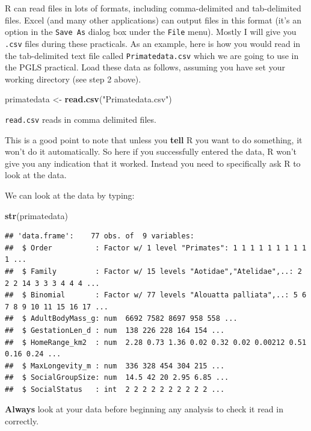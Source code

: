 \documentclass[]{book}
\newenvironment{Shaded}{\begin{snugshade}}{\end{snugshade}}
\newcommand{\KeywordTok}[1]{\textcolor[rgb]{0.13,0.29,0.53}{\textbf{{#1}}}}
\newcommand{\StringTok}[1]{\textcolor[rgb]{0.31,0.60,0.02}{{#1}}}
\newcommand{\NormalTok}[1]{{#1}}
\begin{document}
R can read files in lots of formats, including comma-delimited and
tab-delimited files. Excel (and many other applications) can output
files in this format (it's an option in the \texttt{Save\ As} dialog box
under the \texttt{File} menu). Mostly I will give you \texttt{.csv}
files during these practicals. As an example, here is how you would read
in the tab-delimited text file called \texttt{Primatedata.csv} which we
are going to use in the PGLS practical. Load these data as follows,
assuming you have set your working directory (see step 2 above).

\begin{Shaded}
\begin{Highlighting}[]
\NormalTok{primatedata <-}\StringTok{ }\KeywordTok{read.csv}\NormalTok{(}\StringTok{"Primatedata.csv"}\NormalTok{)}
\end{Highlighting}
\end{Shaded}

\texttt{read.csv} reads in comma delimited files.

This is a good point to note that unless you \textbf{tell} R you want to
do something, it won't do it automatically. So here if you successfully
entered the data, R won't give you any indication that it worked.
Instead you need to specifically ask R to look at the data.

We can look at the data by typing:

\begin{Shaded}
\begin{Highlighting}[]
\KeywordTok{str}\NormalTok{(primatedata)}
\end{Highlighting}
\end{Shaded}

\begin{verbatim}
## 'data.frame':    77 obs. of  9 variables:
##  $ Order          : Factor w/ 1 level "Primates": 1 1 1 1 1 1 1 1 1 1 ...
##  $ Family         : Factor w/ 15 levels "Aotidae","Atelidae",..: 2 2 2 14 3 3 3 4 4 4 ...
##  $ Binomial       : Factor w/ 77 levels "Alouatta palliata",..: 5 6 7 8 9 10 11 15 16 17 ...
##  $ AdultBodyMass_g: num  6692 7582 8697 958 558 ...
##  $ GestationLen_d : num  138 226 228 164 154 ...
##  $ HomeRange_km2  : num  2.28 0.73 1.36 0.02 0.32 0.02 0.00212 0.51 0.16 0.24 ...
##  $ MaxLongevity_m : num  336 328 454 304 215 ...
##  $ SocialGroupSize: num  14.5 42 20 2.95 6.85 ...
##  $ SocialStatus   : int  2 2 2 2 2 2 2 2 2 2 ...
\end{verbatim}

\textbf{Always} look at your data before beginning any analysis to check
it read in correctly.
\end{document}
